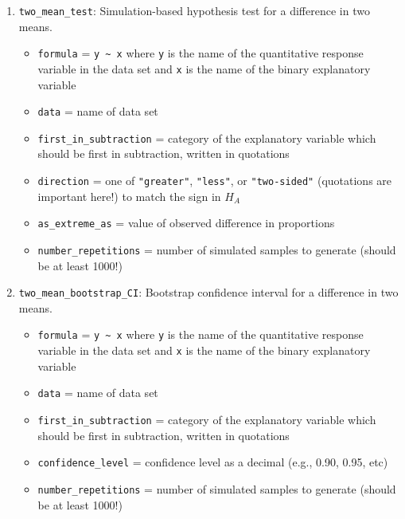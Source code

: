 \documentclass[
  10pt,
  openany]{book}
\providecommand{\tightlist}{%
  \setlength{\itemsep}{0pt}\setlength{\parskip}{0pt}}
\theoremstyle{definition}
\theoremstyle{definition}
\theoremstyle{definition}
\theoremstyle{definition}
\theoremstyle{remark}
\begin{document}
\begin{enumerate}
  \begin{itemize}
  \tightlist
  \item
    \texttt{data} = vector of observed differences; or two-column data frame, with values for each group in the two columns
  \item
    \texttt{which\_first} = name of group which should be first in order of subtraction (if data are two-column data frame)\\
  \item
    \texttt{confidence\_level} = confidence level as a decimal (e.g., 0.90, 0.95, etc)
  \item
    \texttt{number\_repetitions} = number of simulated samples to generate (should be at least 1000!)
  \end{itemize}
\item
  \texttt{two\_mean\_test}: Simulation-based hypothesis test for a difference in two means.

  \begin{itemize}
  \tightlist
  \item
    \texttt{formula} = \texttt{y\ \textasciitilde{}\ x} where \texttt{y} is the name of the quantitative response variable in the data set and \texttt{x} is the name of the binary explanatory variable
  \item
    \texttt{data} = name of data set
  \item
    \texttt{first\_in\_subtraction} = category of the explanatory variable which should be first in subtraction, written in quotations
  \item
    \texttt{direction} = one of \texttt{"greater"}, \texttt{"less"}, or \texttt{"two-sided"} (quotations are important here!) to match the sign in \(H_A\)
  \item
    \texttt{as\_extreme\_as} = value of observed difference in proportions
  \item
    \texttt{number\_repetitions} = number of simulated samples to generate (should be at least 1000!)
  \end{itemize}
\item
  \texttt{two\_mean\_bootstrap\_CI}: Bootstrap confidence interval for a difference in two means.

  \begin{itemize}
  \tightlist
  \item
    \texttt{formula} = \texttt{y\ \textasciitilde{}\ x} where \texttt{y} is the name of the quantitative response variable in the data set and \texttt{x} is the name of the binary explanatory variable
  \item
    \texttt{data} = name of data set
  \item
    \texttt{first\_in\_subtraction} = category of the explanatory variable which should be first in subtraction, written in quotations
  \item
    \texttt{confidence\_level} = confidence level as a decimal (e.g., 0.90, 0.95, etc)
  \item
    \texttt{number\_repetitions} = number of simulated samples to generate (should be at least 1000!)
  \end{itemize}
\end{enumerate}
\end{document}
